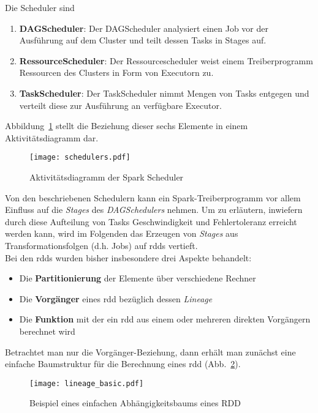 Die Scheduler sind
\begin{enumerate}
	\item \textbf{DAGScheduler}: Der DAGScheduler analysiert einen Job vor der Ausführung auf dem Cluster und teilt dessen Tasks in Stages auf.
	\item \textbf{RessourceScheduler}: Der Ressourcescheduler weist einem Treiberprogramm Ressourcen des Clusters in Form von Executorn zu.
	\item \textbf{TaskScheduler}: Der TaskScheduler nimmt Mengen von Tasks entgegen und verteilt diese zur Ausführung an verfügbare Executor.
\end{enumerate}

Abbildung~\ref{fig:schedulers} stellt die Beziehung dieser sechs Elemente in einem Aktivitätsdiagramm dar.

\begin{figure}[ht!]
	\centering
  \texttt{[image: schedulers.pdf]}
	\caption{Aktivitätsdiagramm der Spark Scheduler}
	\label{fig:schedulers}
\end{figure}

Von den beschriebenen Schedulern kann ein Spark-Treiberprogramm vor allem Einfluss auf die \textit{Stages} des \textit{DAGSchedulers} nehmen.
Um zu erläutern, inwiefern durch diese Aufteilung von Tasks Geschwindigkeit und Fehlertoleranz erreicht werden kann, wird im Folgenden das Erzeugen von \textit{Stages} aus Transformationsfolgen (d.h. Jobs) auf \gls{rdd}s vertieft.\\

Bei den \glspl{rdd} wurden bisher insbesondere drei Aspekte behandelt:
\begin{itemize}
	\item Die \textbf{Partitionierung} der Elemente über verschiedene Rechner
	\item Die \textbf{Vorgänger} eines \gls{rdd} bezüglich dessen \textit{Lineage}
	\item Die \textbf{Funktion} mit der ein \gls{rdd} aus einem oder mehreren direkten Vorgängern berechnet wird
\end{itemize}

Betrachtet man nur die Vorgänger-Beziehung, dann erhält man zunächst eine einfache Baumstruktur für die Berechnung eines \gls{rdd} (Abb.~\ref{fig:lineage_basic}).\\

\begin{figure}[ht!]
	\centering
  \texttt{[image: lineage\_basic.pdf]}
	\caption{Beispiel eines einfachen Abhängigkeitsbaums eines RDD}
	\label{fig:lineage_basic}
\end{figure}

